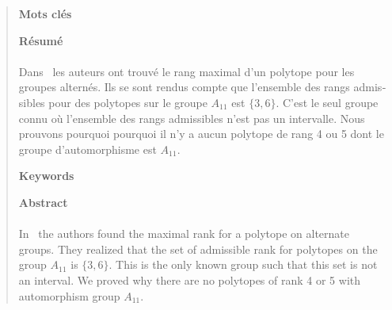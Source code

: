\cleardoublepage{}

\thispagestyle{plain}

\hspace{3cm}

\begin{quote}

\begin{otherlanguage}{french}

\begin{center}
  \textbf{Mots clés}
\end{center}

\begin{center}
  \textbf{Résumé}
\end{center}


\paragraph{}
Dans~\cite{highestRankOfAn} les auteurs ont trouvé le rang maximal d'un polytope pour les groupes alternés. Ils se sont rendus compte que l'ensemble des rangs admissibles pour des polytopes sur le groupe $A_{11}$ est $\{3,6\}$. C'est le seul groupe connu où l'ensemble des rangs admissibles n'est pas un intervalle. Nous prouvons pourquoi pourquoi il n'y a aucun polytope de rang 4 ou 5 dont le groupe d'automorphisme est $A_{11}$.

\end{otherlanguage}

\begin{center}
  \textbf{Keywords}
\end{center}

\begin{center}
  \textbf{Abstract}
\end{center}

\paragraph{}
In~\cite{highestRankOfAn} the authors found the maximal rank for a polytope on alternate groups. They realized that the set of admissible rank for polytopes on the group $A_{11}$ is $\{3,6\}$. This is the only known group such that this set is not an interval. We proved why there are no polytopes of rank 4 or 5 with automorphism group $A_{11}$.

\end{quote}
